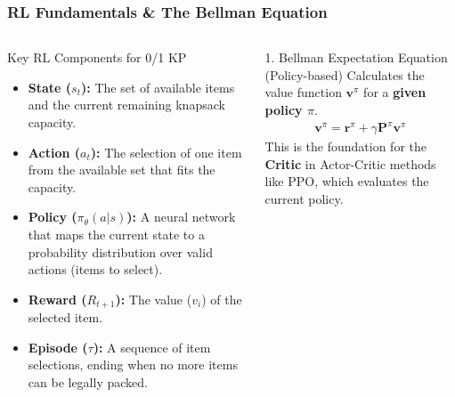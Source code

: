 \begin{frame}
    \frametitle{RL Fundamentals \& The Bellman Equation}

    \begin{columns}[T]
        
        \begin{column}{0.5\textwidth}
            \begin{block}{Key RL Components for 0/1 KP}
                \begin{itemize}
                    \item \textbf{State ($s_t$):} The set of available items and the current remaining knapsack capacity. \vspace{0.5em}
                    
                    \item \textbf{Action ($a_t$):} The selection of one item from the available set that fits the capacity. \vspace{0.5em}
                    
                    \item \textbf{Policy ($\pi_\theta(a|s)$):} A neural network that maps the current state to a probability distribution over valid actions (items to select). \vspace{0.5em}
                    
                    \item \textbf{Reward ($R_{t+1}$):} The value ($v_i$) of the selected item. \vspace{0.5em}
                    
                    \item \textbf{Episode ($\tau$):} A sequence of item selections, ending when no more items can be legally packed.
                \end{itemize}
            \end{block}
        \end{column}
        
        \begin{column}{0.5\textwidth}
            
            \begin{alertblock}{1. Bellman Expectation Equation (Policy-based)}
                Calculates the value function $\mathbf{v}^\pi$ for a \textbf{given policy $\pi$}.
                \begin{align*}
                    \mathbf{v}^{\pi} = \mathbf{r}^{\pi} + \gamma \mathbf{P}^{\pi} \mathbf{v}^{\pi}
                \end{align*}
                This is the foundation for the \textbf{Critic} in Actor-Critic methods like PPO, which evaluates the current policy.
            \end{alertblock}
            

\end{column}
\end{columns}
\end{frame}
